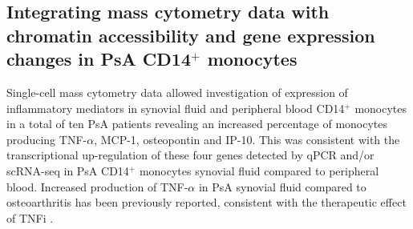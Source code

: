 \subsection{Integrating mass cytometry data with chromatin accessibility and gene expression changes in PsA CD14$^+$ monocytes}

Single-cell mass cytometry data allowed investigation of expression of inflammatory mediators in synovial fluid and peripheral blood CD14$^+$ monocytes in a total of ten PsA patients revealing an increased percentage of monocytes producing TNF-$\alpha$, MCP-1, osteopontin and IP-10. This was consistent with the transcriptional up-regulation of these four genes detected by qPCR and/or scRNA-seq in PsA CD14$^+$ monocytes synovial fluid compared to peripheral blood. Increased production of TNF-$\alpha$ in PsA synovial fluid compared to osteoarthritis has been previously reported, consistent with the therapeutic effect of TNFi  \parencite{Partsch1997}.


